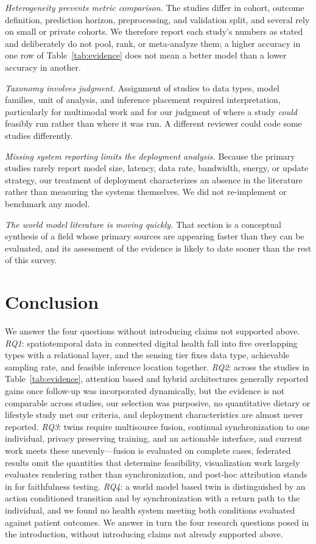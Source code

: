 \documentclass[journal]{IEEEtran}
\newif\ifsubmission
\begin{document}
\emph{Heterogeneity prevents metric comparison.} The studies differ in cohort, outcome definition, prediction horizon, preprocessing, and validation split, and several rely on small or private cohorts. We therefore report each study's numbers as stated and deliberately do not pool, rank, or meta-analyze them; a higher accuracy in one row of Table~\ref{tab:evidence} does not mean a better model than a lower accuracy in another.

\emph{Taxonomy involves judgment.} Assignment of studies to data types, model families, unit of analysis, and inference placement required interpretation, particularly for multimodal work and for our judgment of where a study \emph{could} feasibly run rather than where it was run. A different reviewer could code some studies differently.

\emph{Missing system reporting limits the deployment analysis.} Because the primary studies rarely report model size, latency, data rate, bandwidth, energy, or update strategy, our treatment of deployment characterizes an absence in the literature rather than measuring the systems themselves. We did not re-implement or benchmark any model.

\emph{The world model literature is moving quickly.} That section is a conceptual synthesis of a field whose primary sources are appearing faster than they can be evaluated, and its assessment of the evidence is likely to date sooner than the rest of this survey.

\fi

\section{Conclusion}
\label{sec:conclusion}
\ifsubmission
We answer the four questions without introducing claims not supported above. \emph{RQ1}: spatiotemporal data in connected digital health fall into five overlapping types with a relational layer, and the sensing tier fixes data type, achievable sampling rate, and feasible inference location together. \emph{RQ2}: across the studies in Table~\ref{tab:evidence}, attention based and hybrid architectures generally reported gains once follow-up was incorporated dynamically, but the evidence is not comparable across studies, our selection was purposive, no quantitative dietary or lifestyle study met our criteria, and deployment characteristics are almost never reported. \emph{RQ3}: twins require multisource fusion, continual synchronization to one individual, privacy preserving training, and an actionable interface, and current work meets these unevenly---fusion is evaluated on complete cases, federated results omit the quantities that determine feasibility, visualization work largely evaluates rendering rather than synchronization, and post-hoc attribution stands in for faithfulness testing. \emph{RQ4}: a world model based twin is distinguished by an action conditioned transition and by synchronization with a return path to the individual, and we found no health system meeting both conditions evaluated against patient outcomes.
\else
We answer in turn the four research questions posed in the introduction, without introducing claims not already supported above.
\end{document}
